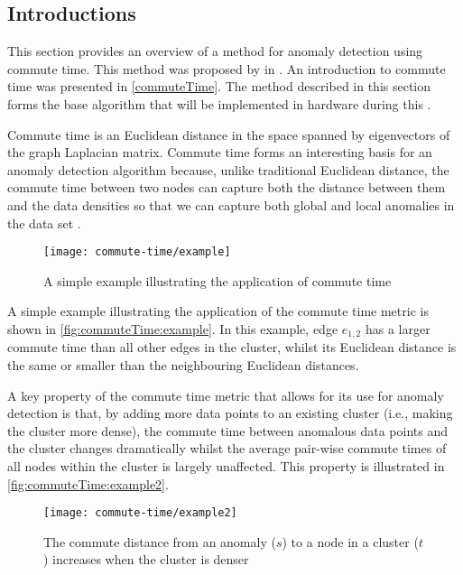 \subsection{Introductions}
\label{anomalyDetection:commuteTime:introduction}
This section provides an overview of a method for anomaly detection using
commute time. This method was proposed by \citeauthor{Khoa:2012} in
 \cite{Khoa:2012}. An introduction to commute time was
presented in \autoref{commuteTime}. The method described in this section forms
the base algorithm that will be implemented in hardware during this \thesis{}.

Commute time is an Euclidean distance in the space spanned by eigenvectors of
the graph Laplacian matrix. Commute time forms an interesting basis for an
anomaly detection algorithm because, unlike traditional Euclidean distance,
the commute time between two nodes can capture both the distance between them
and the data densities so that we can capture both global and local anomalies in
the data set \cite{Khoa:2012}.

\begin{figure}
    \centering
    \texttt{[image: commute-time/example]}
    \caption[A simple example illustrating the application of commute time]{A
        simple example illustrating the application of commute time
        \cite{Khoa:2012}}
    \label{fig:commuteTime:example}
\end{figure}

A simple example illustrating the application of the commute time metric is
shown in \autoref{fig:commuteTime:example}. In this example, edge $e_{1,2}$ has
a larger commute time than all other edges in the cluster, whilst its Euclidean
distance is the same or smaller than the neighbouring Euclidean distances.

A key property of the commute time metric that allows for its use for anomaly
detection is that, by adding more data points to an existing cluster (i.e.,
making the cluster more dense), the commute time between anomalous data points
and the cluster changes dramatically whilst the average pair-wise commute times
of all nodes within the cluster is largely unaffected. This property is
illustrated in \autoref{fig:commuteTime:example2}.

\begin{figure}
    \centering
    \texttt{[image: commute-time/example2]}
    \caption[The commute distance from an anomaly to a node in a cluster
        increases when the cluster is denser]{The commute distance from an
        anomaly ($s$) to a node in a cluster ($t$) increases when the cluster is
        denser \cite{Khoa:2012}}
\end{figure}


